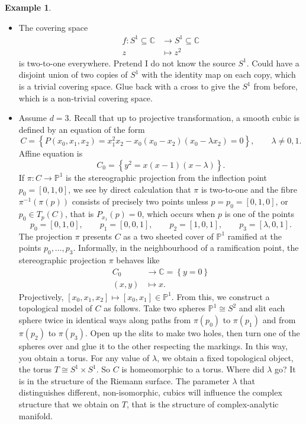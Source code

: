 \documentclass{article}
\newcommand{\C}{\mathbb{C}}
\renewcommand{\P}{\mathbb{P}}
\newcommand{\rb}[1]{\left( #1 \right)}
\renewcommand{\sb}[1]{\left[ #1 \right]}
\newcommand{\cb}[1]{\left\{ #1 \right\}}
\theoremstyle{definition}\newtheorem{definition}{Definition}[section]
\theoremstyle{definition}\newtheorem{notation}[definition]{Notation}
\theoremstyle{definition}\newtheorem{remark}[definition]{Remark}
\theoremstyle{definition}\newtheorem{example1}[definition]{Example}
\theoremstyle{definition}\newtheorem{fact}{Fact}
\theoremstyle{definition}\newtheorem{exercise}{Exercise}
\theoremstyle{definition}\newtheorem*{example2}{Example}
\begin{document}
\begin{example2}
\hfill
\begin{itemize}
\item The covering space
\begin{align*}
f : S^1 \subseteq \C & \to S^1 \subseteq \C \\
z & \mapsto z^2
\end{align*}
is two-to-one everywhere. Pretend I do not know the source $ S^1 $. Could have a disjoint union of two copies of $ S^1 $ with the identity map on each copy, which is a trivial covering space. Glue back with a cross to give the $ S^1 $ from before, which is a non-trivial covering space.
\item Assume $ d = 3 $. Recall that up to projective transformation, a smooth cubic is defined by an equation of the form
$$ C = \cb{P\rb{x_0, x_1, x_2} = x_1^2x_2 - x_0\rb{x_0 - x_2}\rb{x_0 - \lambda x_2} = 0}, \qquad \lambda \ne 0, 1. $$
Affine equation is
$$ C_0 = \cb{y^2 = x\rb{x - 1}\rb{x - \lambda}}. $$
If $ \pi : C \to \P^1 $ is the stereographic projection from the inflection point $ p_0 = \sb{0, 1, 0} $, we see by direct calculation that $ \pi $ is two-to-one and the fibre $ \pi^{-1}\rb{\pi\rb{p}} $ consists of precisely two points unless $ p = p_0 = \sb{0, 1, 0} $, or $ p_0 \in T_p\rb{C} $, that is $ P_{x_1}\rb{p} = 0 $, which occurs when $ p $ is one of the points
$$ p_0 = \sb{0, 1, 0}, \qquad p_1 = \sb{0, 0, 1}, \qquad p_2 = \sb{1, 0, 1}, \qquad p_3 = \sb{\lambda, 0, 1}. $$
The projection $ \pi $ presents $ C $ as a two sheeted cover of $ \P^1 $ ramified at the points $ p_0, \dots, p_3 $. Informally, in the neighbourhood of a ramification point, the stereographic projection $ \pi $ behaves like
\begin{align*}
C_0 & \to \C = \cb{y = 0} \\
\rb{x, y} & \mapsto x.
\end{align*}
Projectively, $ \sb{x_0, x_1, x_2} \mapsto \sb{x_0, x_1} \in \P^1 $. From this, we construct a topological model of $ C $ as follows. Take two spheres $ \P^1 \cong S^2 $ and slit each sphere twice in identical ways along paths from $ \pi\rb{p_0} $ to $ \pi\rb{p_1} $ and from $ \pi\rb{p_2} $ to $ \pi\rb{p_3} $. Open up the slits to make two holes, then turn one of the spheres over and glue it to the other respecting the markings. In this way, you obtain a torus. For any value of $ \lambda $, we obtain a fixed topological object, the torus $ T \cong S^1 \times S^1 $. So $ C $ is homeomorphic to a torus. Where did $ \lambda $ go? It is in the structure of the Riemann surface. The parameter $ \lambda $ that distinguishes different, non-isomorphic, cubics will influence the complex structure that we obtain on $ T $, that is the structure of complex-analytic manifold.

\end{itemize}
\end{example2}
\end{document}
